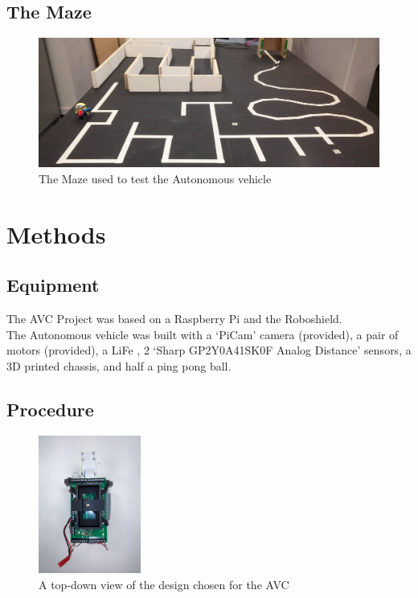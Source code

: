\documentclass[paper=a4, fontsize=11pt]{scrartcl} %
\numberwithin{equation}{section} %
\numberwithin{figure}{section} %
\begin{document}
\subsection{The Maze}
\begin{figure}[h]
  \includegraphics[width=\textwidth]{maze}
  \centering
  \caption{The Maze used to test the Autonomous vehicle}
\end{figure}



\section{Methods}
\subsection{Equipment}
The AVC Project was based on a Raspberry Pi and the Roboshield.\\
The Autonomous vehicle was built with a `PiCam' camera (provided), a pair of
motors (provided), a LiFe , 2 `Sharp GP2Y0A41SK0F Analog Distance' sensors, a 3D printed
chassis, and half a ping pong ball.
\subsection{Procedure}
\begin{figure}
  \begin{center}
    \includegraphics[width=0.3\textwidth]{top-down-view}
    \caption{A top-down view of the design chosen for the AVC}
  \end{center}
\end{figure}
\end{document}
